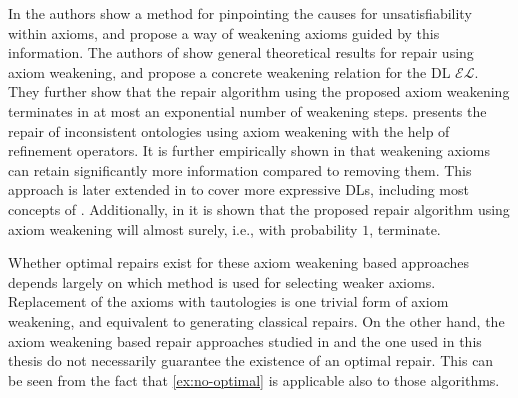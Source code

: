 In \cite{lam2008fine} the authors show a method for pinpointing the causes for unsatisfiability within axioms, and propose a way of weakening axioms guided by this information. The authors of \cite{baader2018making} show general theoretical results for repair using axiom weakening, and propose a concrete weakening relation for the DL $\mathcal{EL}$. They further show that the repair algorithm using the proposed axiom weakening terminates in at most an exponential number of weakening steps. \cite{troquard2018repairing} presents the repair of inconsistent ontologies using axiom weakening with the help of refinement operators. It is further empirically shown in \cite{troquard2018repairing} that weakening axioms can retain significantly more information compared to removing them. This approach is later extended in \cite{confalonieri2020towards,confalonieri2022irresistible} to cover more expressive DLs, including most concepts of \SROIQ. Additionally, in \cite{confalonieri2020towards} it is shown that the proposed repair algorithm using axiom weakening will almost surely, i.e., with probability $1$, terminate.

Whether optimal repairs exist for these axiom weakening based approaches depends largely on which method is used for selecting weaker axioms. Replacement of the axioms with tautologies is one trivial form of axiom weakening, and equivalent to generating classical repairs. On the other hand, the axiom weakening based repair approaches studied in \cite{troquard2018repairing,confalonieri2020towards} and the one used in this thesis do not necessarily guarantee the existence of an optimal repair. This can be seen from the fact that \cref{ex:no-optimal} is applicable also to those algorithms.
